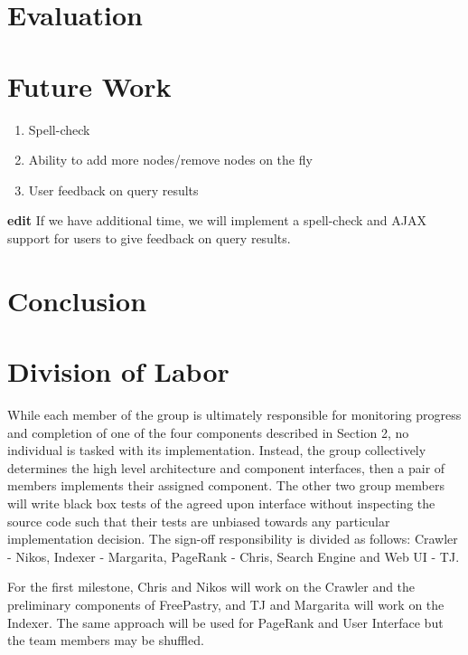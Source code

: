 \documentclass[11pt, letterpaper, oneside, twocolumn]{article}
\begin{document}
\section{Evaluation}
\label{sec:evaluation}

\section{Future Work}
\label{sec:future}

\begin{enumerate}
\item Spell-check
\item Ability to add more nodes/remove nodes on the fly
\item User feedback on query results
\end{enumerate}


\textbf{edit}
If we have additional time, we will implement a spell-check and AJAX support for users to give feedback on query results.


\section{Conclusion}
\label{sec:conculsion}

\section{ Division of Labor }
\label{sec:labor}

While each member of the group is ultimately responsible for monitoring progress and completion of one of the four components described in Section 2, no individual is tasked with its implementation. Instead, the group collectively determines the high level architecture and component interfaces, then a pair of members implements their assigned component.  The other two group members will write black box tests of the agreed upon interface without inspecting the source code such that their tests are unbiased towards any particular implementation decision. The sign-off responsibility is divided as follows: Crawler - Nikos, Indexer - Margarita, PageRank - Chris, Search Engine and Web UI - TJ.

For the first milestone, Chris and Nikos will work on the Crawler and the preliminary components of FreePastry, and TJ and Margarita will work on the Indexer. The same approach will be used for PageRank and User Interface but the team members may be shuffled.
\end{document}
